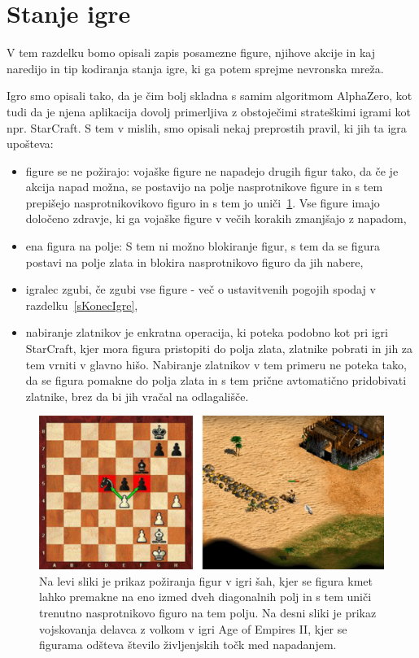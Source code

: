 \documentclass[a4paper, 12pt]{book}
\begin{document}
\section{Stanje igre}
\label{stanjeigre}
V tem razdelku bomo opisali zapis posamezne figure, njihove akcije in kaj naredijo in tip kodiranja stanja igre, ki ga potem sprejme nevronska mreža.

Igro smo opisali tako, da je čim bolj skladna s samim algoritmom AlphaZero, kot tudi da je njena aplikacija dovolj primerljiva z obstoječimi strateškimi igrami kot npr. StarCraft.
S tem v mislih, smo opisali nekaj preprostih pravil, ki jih ta igra upošteva:
\begin{itemize}
	\item figure se ne požirajo: vojaške figure ne napadejo drugih figur tako, da če je akcija napad možna, se postavijo na polje nasprotnikove figure in s tem prepišejo nasprotnikovikovo figuro in s tem jo uniči~\ref{picPoziranjeFigur}. 
	Vse figure imajo določeno zdravje, ki ga vojaške figure v večih korakih zmanjšajo z napadom,
	\item ena figura na polje: S tem ni možno blokiranje figur, s tem da se figura postavi na polje zlata in blokira nasprotnikovo figuro da jih nabere,
	\item igralec zgubi, če zgubi vse figure - več o ustavitvenih pogojih spodaj v razdelku~\ref{sKonecIgre},
	\item nabiranje zlatnikov je enkratna operacija, ki poteka podobno kot pri igri StarCraft, kjer mora figura pristopiti do polja zlata, zlatnike pobrati in jih za tem vrniti v glavno hišo.
	Nabiranje zlatnikov v tem primeru ne poteka tako, da se figura pomakne do polja zlata in s tem prične avtomatično pridobivati zlatnike, brez da bi jih vračal na odlagališče.

\end{itemize}

\begin{figure}[h]
	\begin{center}
		\includegraphics[width=1\textwidth]{photos/horizontal_health.pdf}
	\end{center}
	\caption{Na levi sliki je prikaz požiranja figur v igri šah, kjer se figura kmet lahko premakne na eno izmed dveh diagonalnih polj in s tem uniči trenutno nasprotnikovo figuro na tem polju. 
		Na desni sliki je prikaz vojskovanja delavca z volkom v igri Age of Empires II, kjer se figurama odšteva število življenjskih točk med napadanjem.}
	\label{picPoziranjeFigur}
\end{figure}
\end{document}
